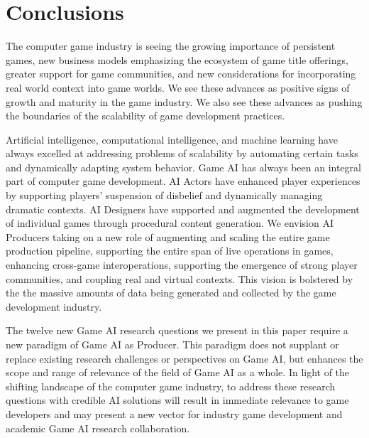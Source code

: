 \documentclass[conference]{IEEEtran}
\begin{document}

\section{Conclusions}

The computer game industry is seeing the growing importance of persistent games, new business models emphasizing the ecosystem of game title offerings, greater support for game communities, and new considerations for incorporating real world context into game worlds.
We see these advances as positive signs of growth and maturity in the game industry.
We also see these advances as pushing the boundaries of the scalability of game development practices.

Artificial intelligence, computational intelligence, and machine learning have always excelled at addressing problems of scalability by automating certain tasks and dynamically adapting system behavior.
Game AI
has always been an integral part of computer game development.
AI Actors have enhanced player experiences by supporting players' suspension of disbelief and dynamically managing dramatic contexts.
AI Designers have supported and augmented the development of individual games through procedural content generation.
%
We envision AI Producers taking on a new role of augmenting and scaling the entire game production pipeline, supporting the entire span of live operations in games, enhancing cross-game interoperations, supporting the emergence of strong player communities, and coupling real and virtual contexts.
This vision is bolstered by the the massive amounts of data being generated and collected by the game development industry.

The twelve new Game AI research questions we present in this paper require a new paradigm of Game AI as Producer.
This paradigm does not supplant or replace existing research challenges or perspectives on Game AI, but enhances the scope and range of relevance of the field of Game AI as a whole.
In light of the shifting landscape of the computer game industry, to address these research questions with credible AI solutions will result in immediate relevance to game developers and may present a new vector for industry game development and academic Game AI research collaboration. 
\end{document}
